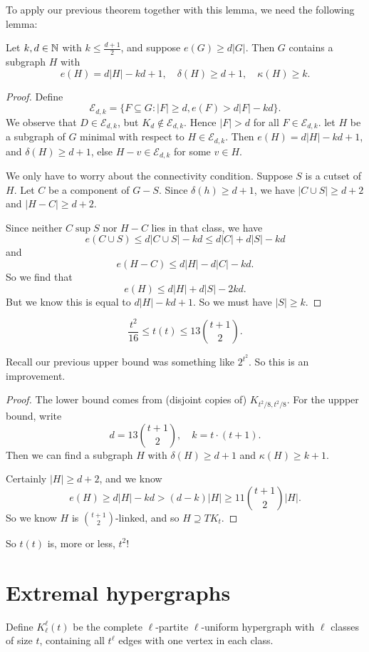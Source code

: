 \documentclass[a4paper]{article}
\begin{document}
To apply our previous theorem together with this lemma, we need the following lemma:
\begin{lemma}
  Let $k, d \in \mathbb{N}$ with $k \leq \frac{d + 1}{2}$, and suppose $e(G) \geq d|G|$. Then $G$ contains a subgraph $H$ with
  \[
    e(H) = d|H| - kd + 1,\quad \delta(H) \geq d + 1,\quad \kappa(H) \geq k.
  \]
\end{lemma}

\begin{proof}
  Define
  \[
    \mathcal{E}_{d, k} = \{F \subseteq G: |F| \geq d, e(F) > d|F| - kd\}.
  \]
  We observe that $D \in \mathcal{E}_{d, k}$, but $K_d \not \in \mathcal{E}_{d, k}$. Hence $|F| > d$ for all $F \in \mathcal{E}_{d, k}$. let $H$ be a subgraph of $G$ minimal with respect to $H \in \mathcal{E}_{d, k}$. Then $e(H) = d|H| - kd + 1$, and $\delta(H) \geq d + 1$, else $H - v \in \mathcal{E}_{d,k}$ for some $v \in H$.

  We only have to worry about the connectivity condition. Suppose $S$ is a cutset of $H$. Let $C$ be a component of $G - S$. Since $\delta(h) \geq d + 1$, we have $|C \cup S| \geq d + 2$ and $|H - C| \geq d + 2$.

  Since neither $C \sup S$ nor $H - C$ lies in that class, we have
  \[
    e(C \cup S) \leq d|C \cup S| - kd \leq d|C| + d |S| - kd
  \]
  and
  \[
    e(H - C) \leq d|H| - d|C| - kd.
  \]
  So we find that
  \[
    e(H) \leq d|H| + d|S| - 2 kd.
  \]
  But we know this is equal to $d|H| - kd + 1$. So we must have $|S| \geq k$.
\end{proof}

\begin{thm}
  \[
    \frac{t^2}{16} \leq t(t) \leq 13 \binom{t + 1}{2}.
  \]
\end{thm}
Recall our previous upper bound was something like $2^{t^2}$. So this is an improvement.
\begin{proof}
  The lower bound comes from (disjoint copies of) $K_{t^2/8, t^2/8}$. For the uppper bound, write
  \[
    d = 13 \binom{t + 1}{2},\quad k = t\cdot (t + 1).
  \]
  Then we can find a subgraph $H$ with $\delta(H) \geq d + 1$ and $\kappa(H) \geq k + 1$.

  Certainly $|H| \geq d + 2$, and we know
  \[
    e(H) \geq d |H| - kd > (d - k)|H| \geq 11 \binom{t + 1}{2} |H|.
  \]
  So we know $H$ is $\binom{t + 1}{2}$-linked, and so $H \supseteq TK_t$.
\end{proof}
So $t(t)$ is, more or less, $t^2$!

\section{Extremal hypergraphs}
Define $K_\ell^\ell(t)$ be the complete $\ell$-partite $\ell$-uniform hypergraph with $\ell$ classes of size $t$, containing all $t^{\ell}$ edges with one vertex in each class.
\end{document}
